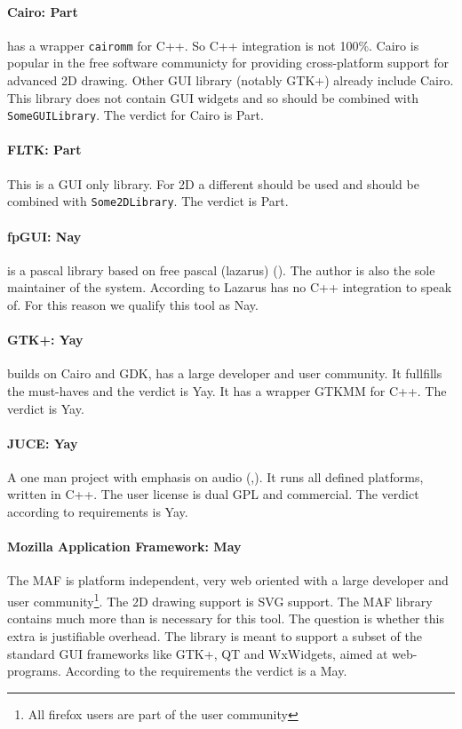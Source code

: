 \paragraph{Cairo: Part} has a wrapper \verb!cairomm! for C++. So C++ integration
is not 100\%. Cairo is popular in the free software communicty for providing
cross-platform support for advanced 2D drawing. Other GUI library (notably
GTK+) already include Cairo.  This library does not contain GUI widgets and so
should be combined with \verb!SomeGUILibrary!. The verdict for Cairo is Part.

\paragraph{FLTK: Part} This is a GUI only library. For 2D a different should be
used and should be combined with \verb!Some2DLibrary!. The verdict is Part.

\paragraph{fpGUI: Nay} is a pascal library based on free pascal (lazarus)
(\cite{Geldenhuys:fpgui}).  The author is also the sole maintainer of the
system. According to \cite{wxwidget:comparison} Lazarus has no C++ integration
to speak of. For this reason we qualify this tool as Nay. 

\paragraph{GTK+: Yay} builds on Cairo and GDK, has a large developer and user
community.  It fullfills the must-haves and the verdict is Yay. It has a
wrapper GTKMM for C++. The verdict is Yay.

\paragraph{JUCE: Yay} A one man project with emphasis on audio
(\cite{juce:juce},\cite{wiki:juce}).  It runs all defined platforms, written in
C++. The user license is dual GPL and commercial.  The verdict according to
requirements is Yay.

\paragraph{Mozilla Application Framework: May} The MAF is platform independent,
very web oriented with a large developer and user community\footnote{All
firefox users are part of the user community}. The 2D drawing support is SVG
support. The MAF library contains much more than is necessary for this tool.
The question is whether this extra is justifiable overhead. The library is
meant to support a subset of the standard GUI frameworks like GTK+, QT and
WxWidgets, aimed at web-programs. According to the requirements the verdict is
a May.

